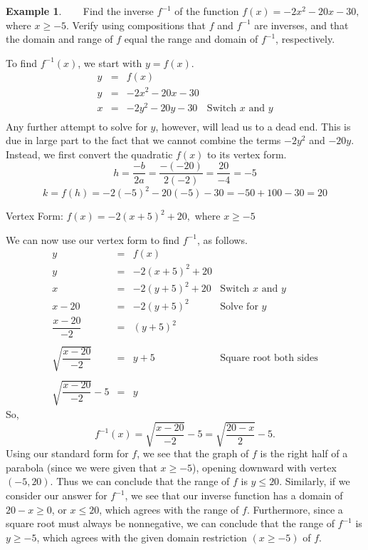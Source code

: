 \documentclass[12pt]{book}
\theoremstyle{definition}
\newtheorem{example}{Example}
\begin{document}
\begin{example}~~~  Find the inverse $f^{-1}$ of the function $f(x) = -2x^2-20x-30,$ where $x\geq -5$.  Verify using compositions that $f$ and $f^{-1}$ are inverses, and that the domain and range of $f$ equal the range and domain of $f^{-1}$, respectively.\par
To find $f^{-1}(x)$, we start with $y=f(x)$.
\[ \begin{array}{rclr}
y & = & f(x) & \\ [5pt]
y & = &  -2x^2-20x-30 & \\ [7pt]
x & = & -2y^2-20y-30 & \mbox{Switch $x$ and $y$} \\ [3pt]
\end{array} \]
Any further attempt to solve for $y$, however, will lead us to a dead end.  This is due in large part to the fact that we cannot combine the terms $-2y^2$ and $-20y$.  Instead, we first convert the quadratic $f(x)$ to its vertex form.
$$h=\frac{-b}{2a}=\frac{-(-20)}{2(-2)}=\frac{20}{-4}=-5$$
$$k=f(h)=-2(-5)^2-20(-5)-30=-50+100-30=20$$
\begin{center}
Vertex Form: $f(x)=-2(x+5)^2+20,$ where $x\geq -5$
\end{center}
We can now use our vertex form to find $f^{-1}$, as follows.
\[ \begin{array}{rcll}
y & = & f(x) & \\ [5pt]
y & = &  -2(x+5)^2+20 & \\ [7pt]
x & = & -2(y+5)^2+20 & \mbox{Switch $x$ and $y$} \\ [3pt]
x-20 & = & -2(y+5)^2 & \mbox{Solve for $y$} \\ [3pt]
\dfrac{x-20}{-2} & = & (y+5)^2 & \\
& & & \\
\sqrt{\dfrac{x-20}{-2}} & = & y+5 & \mbox{Square root both sides} \\ [3pt]
& & & \\
\sqrt{\dfrac{x-20}{-2}}-5 & = & y & 
\end{array} \]
So, $$f^{-1}(x)=\sqrt{\frac{x-20}{-2}}-5=\sqrt{\frac{20-x}{2}}-5.$$
Using our standard form for $f$, we see that the graph of $f$ is the right half of a parabola (since we were given that $x\geq -5$), opening downward with vertex $(-5,20)$.  Thus we can conclude that the range of $f$ is $y\leq 20$.  Similarly, if we consider our answer for $f^{-1}$, we see that our inverse function has a domain of $20-x\geq 0$, or $x\leq 20$, which agrees with the range of $f$.  Furthermore, since a square root must always be nonnegative, we can conclude that the range of $f^{-1}$ is $y\geq -5$, which agrees with the given domain restriction $(x\geq -5)$ of $f$.\par

\end{example}
\end{document}
